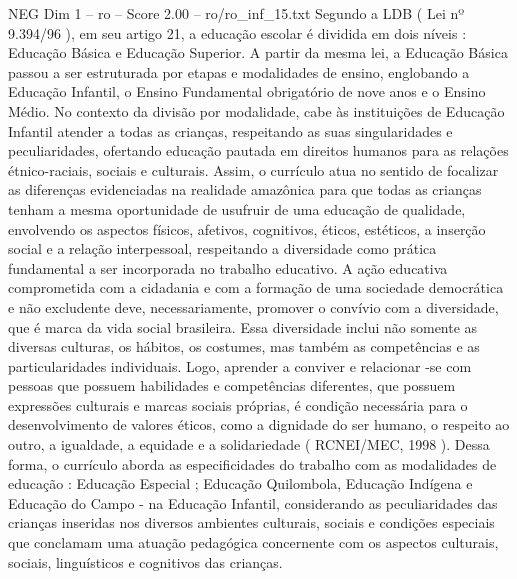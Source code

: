 \begin{textsample}{NEG Dim 1 – ro – Score 2.00 – ro/ro\_inf\_15.txt}  \label{ex:f1_neg_155}
Segundo a LDB ( Lei nº 9.394/96 ), em seu artigo 21, a educação escolar é dividida em dois níveis : Educação Básica e Educação Superior.
A partir da mesma lei, a Educação Básica passou a ser estruturada por etapas e modalidades de ensino, englobando a Educação Infantil, o Ensino Fundamental obrigatório de nove anos e o Ensino Médio.
No contexto da divisão por modalidade, cabe às instituições de Educação Infantil atender a todas as crianças, respeitando as suas singularidades e peculiaridades, ofertando educação pautada em direitos humanos para as relações étnico-raciais, sociais e culturais.
Assim, o currículo atua no sentido de focalizar as diferenças evidenciadas na realidade amazônica para que todas as crianças tenham a mesma oportunidade de usufruir de uma educação de qualidade, envolvendo os aspectos físicos, afetivos, cognitivos, éticos, estéticos, a inserção social e a relação interpessoal, respeitando a diversidade como prática fundamental a ser incorporada no trabalho educativo.
A ação educativa comprometida com a cidadania e com a formação de uma sociedade democrática e não excludente deve, necessariamente, promover o convívio com a diversidade, que é marca da vida social brasileira.
Essa diversidade inclui não somente as diversas culturas, os hábitos, os costumes, mas também as competências e as particularidades individuais.
Logo, aprender a conviver e relacionar -se com pessoas que possuem habilidades e competências diferentes, que possuem expressões culturais e marcas sociais próprias, é condição necessária para o desenvolvimento de valores éticos, como a dignidade do ser humano, o respeito ao outro, a igualdade, a equidade e a solidariedade ( RCNEI/MEC, 1998 ).
Dessa forma, o currículo aborda as especificidades do trabalho com as modalidades de educação : Educação Especial ; Educação Quilombola, Educação Indígena e Educação do Campo - na Educação Infantil, considerando as peculiaridades das crianças inseridas nos diversos ambientes culturais, sociais e condições especiais que conclamam uma atuação pedagógica concernente com os aspectos culturais, sociais, linguísticos e cognitivos das crianças.

\end{textsample}
